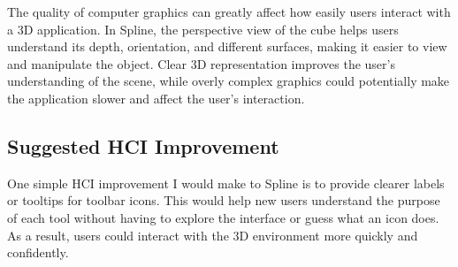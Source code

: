 \documentclass[12pt,a4paper]{article}
\begin{document}
The quality of computer graphics can greatly affect how easily users interact with a 3D application. In Spline, the perspective view of the cube helps users understand its depth, orientation, and different surfaces, making it easier to view and manipulate the object. Clear 3D representation improves the user's understanding of the scene, while overly complex graphics could potentially make the application slower and affect the user's interaction.

\subsection{Suggested HCI Improvement}

One simple HCI improvement I would make to Spline is to provide clearer labels or tooltips for toolbar icons. This would help new users understand the purpose of each tool without having to explore the interface or guess what an icon does. As a result, users could interact with the 3D environment more quickly and confidently.
\end{document}
